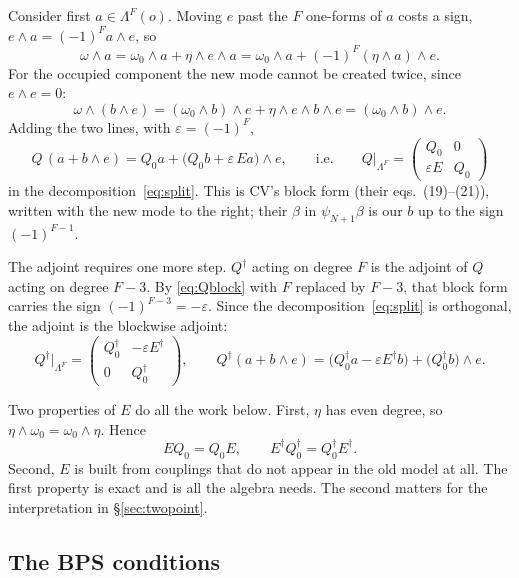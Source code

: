 \documentclass[11pt]{article}
\newcommand{\eps}{\varepsilon}
\theoremstyle{plain}
\theoremstyle{remark}
\numberwithin{equation}{section}
\begin{document}
Consider first $a\in\Lambda^F(o)$. Moving $e$ past the $F$ one-forms of $a$ costs a sign, $e\wedge a=(-1)^Fa\wedge e$, so
\[
\omega\wedge a=\omega_0\wedge a+\eta\wedge e\wedge a=\omega_0\wedge a+(-1)^F(\eta\wedge a)\wedge e .
\]
For the occupied component the new mode cannot be created twice, since $e\wedge e=0$:
\[
\omega\wedge(b\wedge e)=(\omega_0\wedge b)\wedge e+\eta\wedge e\wedge b\wedge e=(\omega_0\wedge b)\wedge e .
\]
Adding the two lines, with $\eps=(-1)^F$,
\begin{equation}\label{eq:Qblock}
Q\,(a+b\wedge e)=Q_0a+\big(Q_0b+\eps\,Ea\big)\wedge e,
\qquad\text{i.e.}\qquad
Q\big|_{\Lambda^F}=\begin{pmatrix}Q_0&0\\ \eps E&Q_0\end{pmatrix}
\end{equation}
in the decomposition~\eqref{eq:split}. This is CV's block form (their eqs.~(19)--(21)), written with the new mode to the
right; their $\beta$ in $\psi_{N+1}\beta$ is our $b$ up to the sign $(-1)^{F-1}$.

The adjoint requires one more step. $Q^\dagger$ acting on degree $F$ is the adjoint of $Q$ acting on degree $F-3$. By
\eqref{eq:Qblock} with $F$ replaced by $F-3$, that block form carries the sign $(-1)^{F-3}=-\eps$. Since the
decomposition~\eqref{eq:split} is orthogonal, the adjoint is the blockwise adjoint:
\begin{equation}\label{eq:Qdagblock}
Q^\dagger\big|_{\Lambda^F}=\begin{pmatrix}Q_0^\dagger&-\eps E^\dagger\\ 0&Q_0^\dagger\end{pmatrix},\qquad
Q^\dagger(a+b\wedge e)=\big(Q_0^\dagger a-\eps E^\dagger b\big)+\big(Q_0^\dagger b\big)\wedge e .
\end{equation}

Two properties of $E$ do all the work below. First, $\eta$ has even degree, so $\eta\wedge\omega_0=\omega_0\wedge\eta$.
Hence
\begin{equation}\label{eq:commute}
EQ_0=Q_0E,\qquad E^\dagger Q_0^\dagger=Q_0^\dagger E^\dagger .
\end{equation}
Second, $E$ is built from couplings that do not appear in the old model at all. The first property is exact and is all
the algebra needs. The second matters for the interpretation in \S\ref{sec:twopoint}.

\subsection{The BPS conditions}
\end{document}
